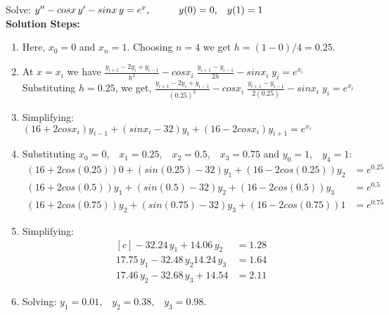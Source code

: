 \documentclass[aima203_lecturenotes_ku.tex]{subfiles}
\begin{document}
\begin{example}
  Solve: $y'' - cosx\, y' -sinx \, y = e^x, \hspace{10mm} y(0)=0, \hspace{3mm} y(1)=1$ \\
  \textbf{Solution Steps:}
  \begin{enumerate}
  \item   Here, $x_0 = 0$ and $x_n = 1$. Choosing $n=4$ we get $h = (1-0)/4 = 0.25$.

  \item At $x=x_i$ we have $\displaystyle \frac{y_{i+1} - 2y_i+ y_{i-1}}{h^2} -cosx_i \; \frac{y_{i+1} - y_{i-1}}{2h} - sinx_i \; y_i = e^{x_i}$ \\[1mm]
    Substituting $h=0.25$, we  get, $\displaystyle \frac{y_{i+1} - 2y_i+ y_{i-1}}{(0.25)^2} -cosx_i \; \frac{y_{i+1} - y_{i-1}}{2(0.25)} - sinx_i \; y_i = e^{x_i}$

\item Simplifying: $(16+2cosx_i)y_{i-1} + (sinx_i-32)y_i + (16 -2cosx_i)y_{i+1} = e^{x_i}$


\item Substituting $x_0=0, \;\;\; x_1=0.25, \;\;\; x_2=0.5, \;\;\; x_3= 0.75$ and $y_0=1, \;\;\; y_4=1$:
  \begin{align*}
    (16+2cos(0.25))0 + (sin(0.25)-32)y_1 + (16 -2cos(0.25))y_2 &= e^{0.25} \\[1mm]
    (16+2cos(0.5))y_1 + (sin(0.5)-32)y_2 + (16 -2cos(0.5))y_3 &= e^{0.5} \\[1mm]
    (16+2cos(0.75))y_2 + (sin(0.75)-32)y_3 + (16 -2cos(0.75))1 &= e^{0.75}
  \end{align*}

\item Simplifying:
  \begin{equation}
    \label{examplesystem}
  \begin{aligned}[c]
    -32.24\, y_1 + 14.06 \, y_2 &= 1.28 \\[1mm]
    17.75 \, y_1 - 32.48\, y_2 14.24 \, y_3 &= 1.64 \\[1mm]
    17.46 \, y_2  -32.68\, y_3 + 14.54 &= 2.11
  \end{aligned}
\end{equation}

\item Solving: $y_1 = 0.01, \;\;\; y_2=0.38, \;\;\; y_3=0.98$.
  \end{enumerate}

\end{example}
\end{document}
